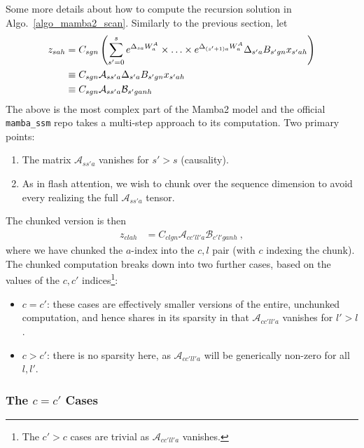 \documentclass[11pt]{article}
\begin{document}
Some more details about how to compute the recursion solution in Algo.~\ref{algo_mamba2_scan}.
Similarly to the previous section, let
\begin{align}
z _{ sah } &= C _{ sgn }\left (\sum _{ s'=0 }^{ s }e^{ \Delta _{ sa }W^{A} _{ a } }\times \ldots \times e^{ \Delta _{ (s'+1)a }W^{A} _{ a } } \Delta _{ s'a }B _{ s'gn } x _{ s'ah }\right )\nonumber\\
 &\equiv C _{ sgn }\mathcal{A}_{ ss'a }\Delta _{ s'a }B _{ s'gn } x _{ s'ah }\nonumber\\
 &\equiv C _{ sgn }\mathcal{A}_{ ss'a }\mathcal{B}_{ s'ganh }
\end{align}
The above is the most complex part of the Mamba2 model and the official \texttt{mamba\_ssm} repo
takes a multi-step approach to its computation. Two primary points:
\begin{enumerate}
    \item The matrix $ \mathcal{A}_{ ss'a  } $ vanishes for $ s' > s  $ (causality).
    \item As in flash attention, we wish to chunk over the sequence dimension to avoid every
        realizing the full $ \mathcal{A}_{ ss'a  } $ tensor.
\end{enumerate}
The chunked version is then
\begin{align}
    z _{ clah } &= C _{ clgn }\mathcal{A}_{cc' ll'a }\mathcal{B}_{ c'l'ganh } \ ,
\end{align}
where we have chunked the $ a  $-index into the $ c, l  $ pair (with $ c  $ indexing the chunk).
The chunked computation breaks down into two further cases, based on the values of the $ c, c'  $
indices\footnote{ The $ c'>c $ cases are trivial as $ \mathcal{A}_{ cc'll'a  } $ vanishes.}:
\begin{itemize}
    \item $ c=c' $: these cases are effectively smaller versions of the entire, unchunked
        computation, and hence shares in its sparsity in that $ \mathcal{A}_{ cc'll'a  }  $ vanishes
        for $ l' > l $.
    \item $ c>c' $: there is no sparsity here, as $ \mathcal{A}_{ cc'll'a  }  $ will be generically
        non-zero for all $ l, l' $.
\end{itemize}

\subsubsection{The $ c=c'  $ Cases}
\end{document}
